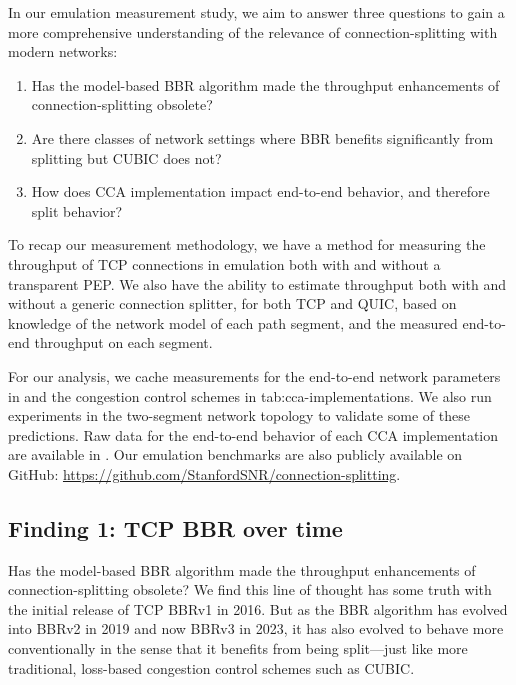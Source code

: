 

In our emulation measurement study, we aim to answer three questions to gain a
more comprehensive understanding of the relevance of connection-splitting with
modern networks:

\begin{enumerate}[noitemsep]
    \item Has the model-based BBR algorithm made the throughput enhancements of
     connection-splitting obsolete?
    \item Are there classes of network settings where BBR benefits significantly
     from splitting but CUBIC does not?
    \item How does CCA implementation impact end-to-end behavior, and therefore split
     behavior?
\end{enumerate}

\noindent To recap our measurement methodology, we have a method for
 measuring the throughput of TCP connections in emulation both with and without a
 transparent PEP. We also have the ability to estimate throughput both with and
 without a generic connection splitter, for both TCP and QUIC, based on
 knowledge of the network model of each path segment, and the measured end-to-end
 throughput on each segment.

For our analysis, we cache measurements for the end-to-end network parameters
in  and the congestion control schemes in \Cref
{tab:cca-implementations}. We also run experiments in the two-segment network topology
to validate some of these predictions. Raw data for the end-to-end
behavior of each CCA implementation are available in .
Our emulation benchmarks are also publicly available on GitHub: \url{https://github.com/StanfordSNR/connection-splitting}.

\subsection{Finding 1: TCP BBR over time}
\label{sec:splitting:results:finding1}


Has the model-based BBR algorithm made the throughput enhancements of
connection-splitting obsolete? We find this line of thought has some truth
with the initial release of TCP BBRv1 in 2016. But as the BBR algorithm has
evolved into BBRv2 in 2019 and now BBRv3 in 2023, it has also evolved to behave
more conventionally in the sense that it benefits from being split---just like
more traditional, loss-based congestion control schemes such as CUBIC.

